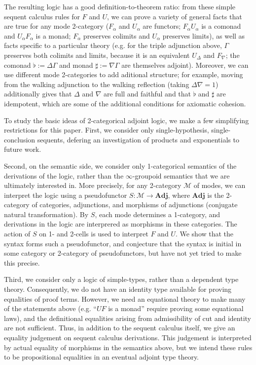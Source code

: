 \documentclass{drl-common/llncs}
\newcommand{\M}{\ensuremath{\mathcal{M}}}
\newcommand{\Adj}{\textbf{Adj}}
\begin{document}
The resulting logic has a good definition-to-theorem ratio: from these
simple sequent calculus rules for $F$ and $U$, we can prove a variety of
general facts that are true for any mode 2-category ($F_\alpha$ and
$U_\alpha$ are functors; $F_\alpha U_\alpha$ is a comonad and $U_\alpha
F_\alpha$ is a monad; $F_\alpha$ preserves colimits and $U_\alpha$
preserves limits), as well as facts specific to a particular theory
(e.g. for the triple adjunction above, $\Gamma$ preserves both colimits
and limits, because it is an equivalent $U_\Delta$ and $F_\nabla$; the
comonad $\flat := \Delta\Gamma$ and monad $\sharp := \nabla\Gamma$ are
themselves adjoint).  Moreover, we can use different mode 2-categories
to add aditional structure; for example, moving from the walking
adjunction to the walking reflection (taking $\Delta \nabla = 1$)
additionally gives that $\Delta$ and $\nabla$ are full and faithful and
that $\flat$ and $\sharp$ are idempotent, which are some of the
additional conditions for axiomatic cohesion.

To study the basic ideas of 2-categorical adjoint logic, we make a few
simplifying restrictions for this paper. First, we consider only
single-hypothesis, single-conclusion sequents, defering an investigation
of products and exponentials to future work.  

Second, on the semantic side, we consider only 1-categorical semantics
of the derivations of the logic, rather than the $\infty$-groupoid
semantics that we are ultimately interested in.  More precisely, for any
2-category \M\/ of modes, we can interpret the logic using a
pseudofunctor $S : \M \to \Adj$, where $\Adj$ is the 2-category of
categories, adjunctions, and morphisms of adjunctions (conjugate natural
transformation).  By $S$, each mode determines a 1-category, and
derivations in the logic are interprered as morphisms in these
categories.  The action of $S$ on 1- and 2-cells is used to interpret
$F$ and $U$.  We show that the syntax forms such a pseudofunctor, and
conjecture that the syntax is initial in some category or 2-category of
pseudofunctors, but have not yet tried to make this precise.

Third, we consider only a logic of simple-types, rather than a dependent
type theory.  Consequently, we do not have an identity type available
for proving equalities of proof terms.  However, we need an equational
theory to make many of the statements above (e.g. ``$UF$ is a monad''
require proving some equational laws), and the definitional equalities
arising from admissibility of cut and identity are not sufficient.
Thus, in addition to the sequent calculus itself, we give an equality
judgement on sequent calculus derivations.  This judgement is
interpreted by actual equality of morphisms in the semantics above, but
we intend these rules to be propositional equalities in an eventual
adjoint type theory.
\end{document}
